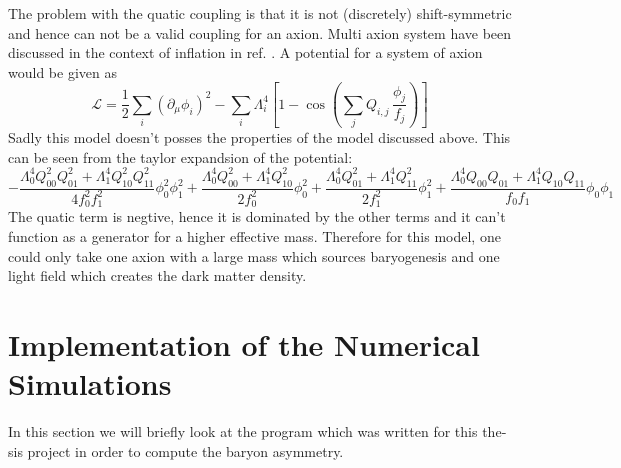 \documentclass[master,       %
               twoside,        %
               BCOR10mm,       %
               english,ngerman, %
               ]{GAUBM}
\begin{document}
\begin{otherlanguage}{english}
The problem with the quatic coupling is that it is not (discretely) shift-symmetric and hence can not be a valid coupling for an axion.
Multi axion system have been discussed in the context of inflation in ref. \cite{Kim_multi_axions:2004rp}.
A potential for a system of axion would be given as
\begin{equation}
	\mathcal{L} = \frac{1}{2} \sum_i \left( \partial_\mu \phi_i \right)^2 - \sum_i \Lambda_i^4 \left[ 1 - \cos \left( \sum_j Q_{i,j} \, \frac{\phi_j}{f_j} \right) \right]
\end{equation}
Sadly this model doesn't posses the properties of the model discussed above.
This can be seen from the taylor expandsion of the potential:
\begin{equation}
	- \frac{\Lambda_{0}^{4} Q_{00}^{2} Q_{01}^{2} + \Lambda_{1}^{4} Q_{10}^{2} Q_{11}^{2} }{4 f_{0}^{2} f_{1}^{2}} \phi_{0}^{2} \phi_{1}^{2}
	+ \frac{\Lambda_{0}^{4} Q_{00}^{2}
	+ \Lambda_{1}^{4} Q_{10}^{2} }{2 f_{0}^{2}} \phi_{0}^{2}
	+ \frac{\Lambda_{0}^{4} Q_{01}^{2}
	+ \Lambda_{1}^{4} Q_{11}^{2}}{2 f_{1}^{2}} \phi_{1}^{2}
	+ \frac{\Lambda_{0}^{4} Q_{00} Q_{01} + \Lambda_{1}^{4} Q_{10} Q_{11} }{f_{0} f_{1}} \phi_{0} \phi_{1}
\end{equation}
The quatic term is negtive, hence it is dominated by the other terms and it can't function as a generator for a higher effective mass.
Therefore for this model, one could only take one axion with a large mass which sources baryogenesis and one light field which creates the dark matter density.


\chapter{Implementation of the Numerical Simulations}
\label{sec:implementation_of_the_numerical_simulations}
In this section we will briefly look at the program which was written for this thesis project in order to compute the baryon asymmetry.


\end{otherlanguage}
\end{document}
